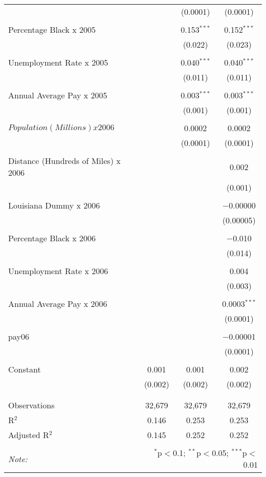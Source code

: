 \documentclass[]{article}
\begin{document}
\begin{table}[!htbp]
\begin{tabular}{@{\extracolsep{5pt}}lccc}
  &  & (0.0001) & (0.0001) \\ 
  & & & \\ 
 Percentage Black x 2005 &  & 0.153$^{***}$ & 0.152$^{***}$ \\ 
  &  & (0.022) & (0.023) \\ 
  & & & \\ 
 Unemployment Rate x 2005 &  & 0.040$^{***}$ & 0.040$^{***}$ \\ 
  &  & (0.011) & (0.011) \\ 
  & & & \\ 
 Annual Average Pay x 2005 &  & 0.003$^{***}$ & 0.003$^{***}$ \\ 
  &  & (0.001) & (0.001) \\ 
  & & & \\ 
 $Population (Millions) x 2006$ &  & 0.0002 & 0.0002 \\ 
  &  & (0.0001) & (0.0001) \\ 
  & & & \\ 
 Distance (Hundreds of Miles) x 2006 &  &  & 0.002 \\ 
  &  &  & (0.001) \\ 
  & & & \\ 
 Louisiana Dummy x 2006 &  &  & $-$0.00000 \\ 
  &  &  & (0.00005) \\ 
  & & & \\ 
 Percentage Black x 2006 &  &  & $-$0.010 \\ 
  &  &  & (0.014) \\ 
  & & & \\ 
 Unemployment Rate x 2006 &  &  & 0.004 \\ 
  &  &  & (0.003) \\ 
  & & & \\ 
 Annual Average Pay x 2006 &  &  & 0.0003$^{***}$ \\ 
  &  &  & (0.0001) \\ 
  & & & \\ 
 pay06 &  &  & $-$0.00001 \\ 
  &  &  & (0.0001) \\ 
  & & & \\ 
 Constant & 0.001 & 0.001 & 0.002 \\ 
  & (0.002) & (0.002) & (0.002) \\ 
  & & & \\ 
\hline \\[-1.8ex] 
Observations & 32,679 & 32,679 & 32,679 \\ 
R$^{2}$ & 0.146 & 0.253 & 0.253 \\ 
Adjusted R$^{2}$ & 0.145 & 0.252 & 0.252 \\ 
\hline 
\hline \\[-1.8ex] 
\textit{Note:}  & \multicolumn{3}{r}{$^{*}$p$<$0.1; $^{**}$p$<$0.05; $^{***}$p$<$0.01} \\ 
\end{tabular} 
\end{table}
\end{document}
